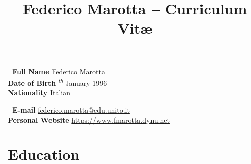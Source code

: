 \documentclass[10pt]{article} %
\begin{document}

\title{Federico Marotta -- Curriculum Vit\ae} %


\parbox{0.5\textwidth}{ %
\begin{tabbing} %
\hspace{3cm} \= \hspace{4cm} \= \kill %
{\bf Full Name} \> Federico Marotta \\
{\bf Date of Birth} \textsuperscript{\textit{th}} January 1996 \\ %
{\bf Nationality} \> Italian %
\end{tabbing}}
\hfill %
\parbox{0.5\textwidth}{ %
\begin{tabbing} %
\hspace{3cm} \= \hspace{4cm} \= \kill %
{\bf E-mail} \> \href{mailto:federico.marotta@edu.unito.it}{federico.marotta@edu.unito.it} \\
{\bf Personal Website} \> \href{https://www.fmarotta.dynu.net}{https://www.fmarotta.dynu.net} \\
\end{tabbing}}



\section{Education}

\end{document}
